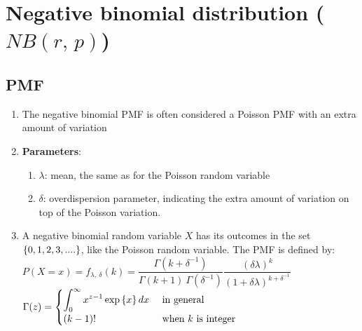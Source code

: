 \section{Negative binomial distribution ($ {\displaystyle  {NB} (r,\,p)}$)}


\subsection{PMF}

\begin{enumerate}
    \item The negative binomial PMF is often considered a Poisson PMF with an extra amount of variation
    \hfill \cite{statistics/book/Statistics-for-Data-Scientists/Maurits-Kaptein}

    \item \textbf{Parameters}:
    \begin{enumerate}
        \item $\lambda$: mean, the same as for the Poisson random variable
        \hfill \cite{statistics/book/Statistics-for-Data-Scientists/Maurits-Kaptein}

        \item $\delta$: overdispersion parameter, indicating the extra amount of variation on top of the Poisson variation.
        \hfill \cite{statistics/book/Statistics-for-Data-Scientists/Maurits-Kaptein}
    \end{enumerate}

    \item A negative binomial random variable $X$ has its outcomes in the set $\left\{0, 1, 2, 3, ....\right\}$, like the Poisson random variable. 
    The PMF is defined by:
    \hfill \cite{statistics/book/Statistics-for-Data-Scientists/Maurits-Kaptein}
    \\
    $
        P(X=x)
        = f_{\lambda,\ \delta}(k)
        = \dfrac{\Gamma(k + \delta^{-1})}{\Gamma(k + 1)\ \Gamma(\delta^{-1})}
        \dfrac{(\delta\lambda)^k}{(1+\delta\lambda)^{k+\delta^{-1}}}
    $
    \hfill \cite{statistics/book/Statistics-for-Data-Scientists/Maurits-Kaptein}
    \\
    $
        \Gamma(z) = \begin{cases}
            \displaystyle\int_{0}^{\infty} x^{z-1} \exp\left\{x\right\} dx & \text{ in general} \\
            (k-1)! & \text{ when $k$ is integer}
        \end{cases}
    $
    \hfill \cite{statistics/book/Statistics-for-Data-Scientists/Maurits-Kaptein}


\end{enumerate}
